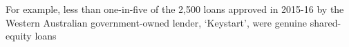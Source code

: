 \documentclass{article}
\begin{document}
For example, less than one-in-five of the 2,500 loans approved in 2015-16 by the Western Australian government-owned lender, `Keystart', were genuine shared-equity loans
\end{document}
